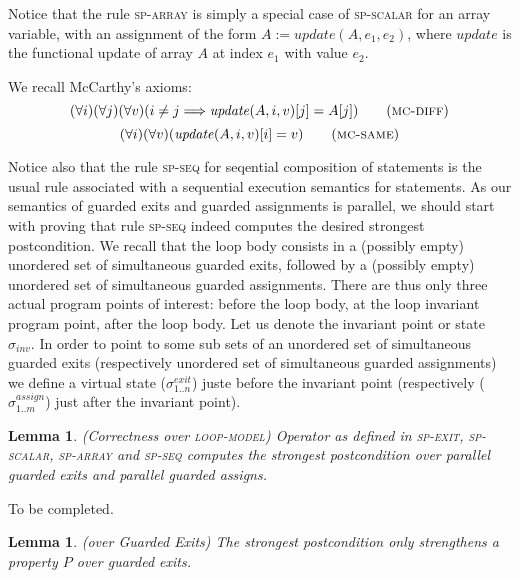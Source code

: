 \documentclass[a4paper,10pt]{article}
\newcommand{\yannick}[1]{{\color{red} #1}}
\newcommand{\impl}{\ensuremath{\Longrightarrow}}
\newcommand{\update}[3]{\ensuremath{\mathit{update}{(#1,#2,#3)}}\xspace}
\newcommand{\loopmodel}{\textsc{loop-model}\xspace}
\newcommand{\state}[1]{\ensuremath{\sigma_{\mathit{#1}}\xspace}}
\newcommand{\vstate}[2]{\ensuremath{\sigma^{\mathit{#1}}_{\mathit{#2}}\xspace}}
\newcommand{\spexit}{\textsc{sp-exit}\xspace}
\newcommand{\spscalar}{\textsc{sp-scalar}\xspace}
\newcommand{\sparray}{\textsc{sp-array}\xspace}
\newcommand{\spseq}{\textsc{sp-seq}\xspace}
\newcommand{\mcdiff}{\textsc{mc-diff}\xspace}
\newcommand{\mcsame}{\textsc{mc-same}\xspace}
\newtheorem{lemma}[theorem]{Lemma}
\newenvironment{proof}[1][Proof.]{\begin{trivlist}
\item[\hskip \labelsep {\bfseries #1}]}{\end{trivlist}}
\begin{document}
Notice that the rule \sparray is simply a special case of \spscalar for an
array variable, with an assignment of the form $A := \update{A}{e_1}{e_2}$,
where $\mathit{update}$ is the functional update of array $A$ at index $e_1$
with value $e_2$.

We recall McCarthy's axioms:
\begin{equation}
(\forall i)(\forall j)(\forall v)(i \neq j \impl \update{A}{i}{v}[j] = A[j])
\tag{\mcdiff}
\end{equation}
\begin{equation}
(\forall i)(\forall v)(\update{A}{i}{v}[i] = v) \tag{\mcsame}
\end{equation}

Notice also that the rule \spseq for seqential composition of statements is the
usual rule associated with a sequential execution semantics for statements. As
our semantics of guarded exits and guarded assignments is parallel, we should
start with proving that rule \spseq indeed computes the desired strongest
postcondition. We recall that the loop body consists in a (possibly empty)
unordered set of simultaneous guarded exits, followed by a 
(possibly empty) unordered set of simultaneous guarded assignments. 
There are thus only three actual program points of interest: before the loop body, 
at the loop invariant program point, after the loop body. Let us denote the invariant 
point or state \state{inv}. In order to point to some sub sets of an unordered set 
of simultaneous guarded exits (respectively unordered set of simultaneous guarded 
assignments) we define a virtual state (\vstate{exit}{1..n}) juste before the invariant point 
(respectively (\vstate{assign}{1..m}) just after the invariant point).

\begin{lemma}
  \emph{(\spostsym Correctness over \loopmodel)} Operator \spostsym as defined in \spexit,
  \spscalar, \sparray and \spseq computes the strongest postcondition over
  parallel guarded exits and parallel guarded assigns.
\label{lemma:sp-correctness}
\end{lemma}

\begin{proof}
  \yannick{To be completed.}
\end{proof}

\begin{lemma}
  \emph{(\spostsym over Guarded Exits)} The strongest postcondition only
  strengthens a property $P$ over guarded exits.
\label{lemma:sp-g-exits}
\end{lemma}
\end{document}
